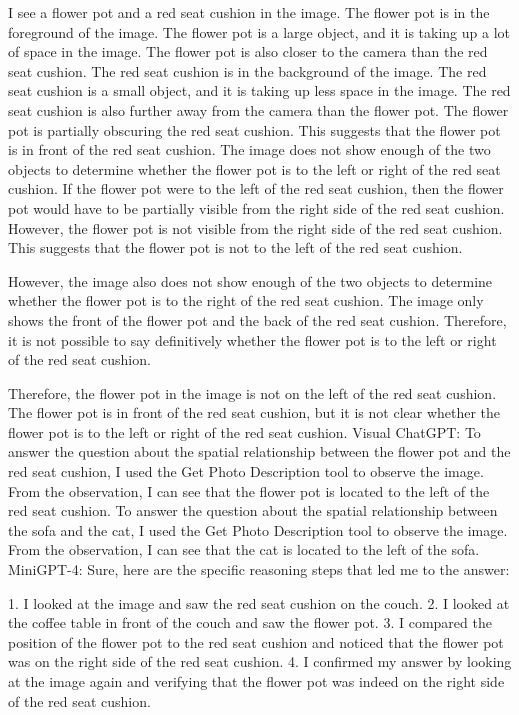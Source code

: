 \begin{enumerate}
    I see a flower pot and a red seat cushion in the image.
    The flower pot is in the foreground of the image. The flower pot is a large object, and it is taking up a lot of space in the image. The flower pot is also closer to the camera than the red seat cushion.
    The red seat cushion is in the background of the image. The red seat cushion is a small object, and it is taking up less space in the image. The red seat cushion is also further away from the camera than the flower pot.
    The flower pot is partially obscuring the red seat cushion. This suggests that the flower pot is in front of the red seat cushion.
    The image does not show enough of the two objects to determine whether the flower pot is to the left or right of the red seat cushion.
    If the flower pot were to the left of the red seat cushion, then the flower pot would have to be partially visible from the right side of the red seat cushion. However, the flower pot is not visible from the right side of the red seat cushion. This suggests that the flower pot is not to the left of the red seat cushion.
    
    However, the image also does not show enough of the two objects to determine whether the flower pot is to the right of the red seat cushion. The image only shows the front of the flower pot and the back of the red seat cushion. Therefore, it is not possible to say definitively whether the flower pot is to the left or right of the red seat cushion.
    
    Therefore, the flower pot in the image is not on the left of the red seat cushion. The flower pot is in front of the red seat cushion, but it is not clear whether the flower pot is to the left or right of the red seat cushion.
    \subitem Visual ChatGPT: To answer the question about the spatial relationship between the flower pot and the red seat cushion, I used the Get Photo Description tool to observe the image. From the observation, I can see that the flower pot is located to the left of the red seat cushion. To answer the question about the spatial relationship between the sofa and the cat, I used the Get Photo Description tool to observe the image. From the observation, I can see that the cat is located to the left of the sofa.
    \subitem MiniGPT-4: Sure, here are the specific reasoning steps that led me to the answer:

    1. I looked at the image and saw the red seat cushion on the couch.
    2. I looked at the coffee table in front of the couch and saw the flower pot.
    3. I compared the position of the flower pot to the red seat cushion and noticed that the flower pot was on the right side of the red seat cushion.
    4. I confirmed my answer by looking at the image again and verifying that the flower pot was indeed on the right side of the red seat cushion.
\end{enumerate}
